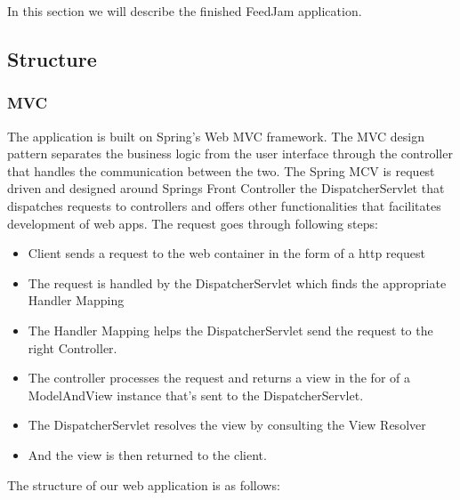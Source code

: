In this section we will describe the finished FeedJam application.
\subsection{Structure}

\subsubsection{MVC} %
\label{sec:MVC}
The application is built on Spring's Web MVC framework. The MVC design pattern separates the business logic from the user interface through the controller that handles the communication between the two. The Spring MCV is request driven and designed around Springs Front Controller the DispatcherServlet that dispatches requests to controllers and offers other functionalities that facilitates development of web apps. The request goes through following steps:

\begin{itemize}
\item Client sends a request to the web container in the form of a http request
\item The request is handled by the DispatcherServlet which finds the appropriate Handler Mapping
\item The Handler Mapping helps the DispatcherServlet send the request to the right Controller. 
\item The controller processes the request and returns a view in the for of a ModelAndView instance that's sent to the DispatcherServlet. 
\item The DispatcherServlet resolves the view by consulting the View Resolver
\item And the view is then returned to the client. 
\end{itemize}

The structure of our web application is as follows:

